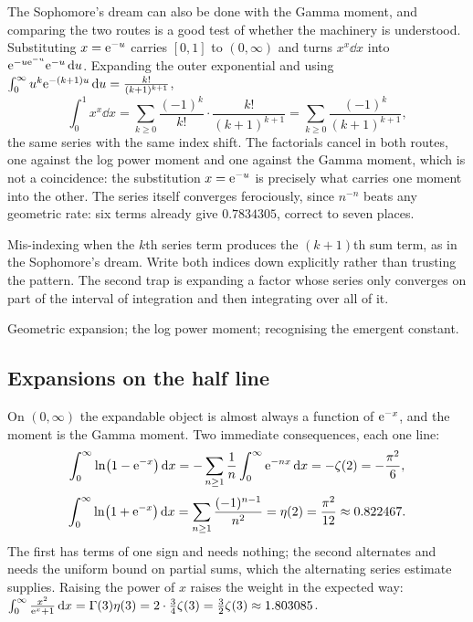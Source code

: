 \begin{keynote}
The Sophomore's dream can also be done with the Gamma moment, and comparing the two routes is a good test of whether the machinery is understood. Substituting $x=\mathrm{e}^{-u}$ carries $[0,1]$ to $(0,\infty)$ and turns $x^{x}\dd x$ into $\mathrm{e}^{-u\mathrm{e}^{-u}}\mathrm{e}^{-u}\,\mathrm{d} u$. Expanding the outer exponential and using $\int_0^\infty u^{k}\mathrm{e}^{-(k+1)u}\,\mathrm{d} u=\frac{k!}{(k+1)^{k+1}}$,
\[\int_0^1x^{x}\dd x=\sum_{k\geq0}\frac{(-1)^{k}}{k!}\cdot\frac{k!}{(k+1)^{k+1}}=\sum_{k\geq0}\frac{(-1)^{k}}{(k+1)^{k+1}},\]
the same series with the same index shift. The factorials cancel in both routes, one against the log power moment and one against the Gamma moment, which is not a coincidence: the substitution $x=\mathrm{e}^{-u}$ is precisely what carries one moment into the other. The series itself converges ferociously, since $n^{-n}$ beats any geometric rate: six terms already give $0.7834305$, correct to seven places.
\end{keynote}

\begin{trap}
Mis-indexing when the $k$th series term produces the $(k+1)$th sum term, as in the Sophomore's dream. Write both indices down explicitly rather than trusting the pattern. The second trap is expanding a factor whose series only converges on part of the interval of integration and then integrating over all of it.
\end{trap}

\begin{seealsob}Geometric expansion; the log power moment; recognising the emergent constant.\end{seealsob}

\subsection{Expansions on the half line}

On $(0,\infty)$ the expandable object is almost always a function of $\mathrm{e}^{-x}$, and the moment is the Gamma moment. Two immediate consequences, each one line:
\[\int_0^{\infty}\ln\bigl(1-\mathrm{e}^{-x}\bigr)\,\mathrm{d} x=-\sum_{n\geq1}\frac1n\int_0^\infty \mathrm{e}^{-nx}\,\mathrm{d} x=-\zeta(2)=-\frac{\pi^{2}}{6},\]
\[\int_0^{\infty}\ln\bigl(1+\mathrm{e}^{-x}\bigr)\,\mathrm{d} x=\sum_{n\geq1}\frac{(-1)^{n-1}}{n^{2}}=\eta(2)=\frac{\pi^{2}}{12}\approx0.822467.\]
The first has terms of one sign and needs nothing; the second alternates and needs the uniform bound on partial sums, which the alternating series estimate supplies. Raising the power of $x$ raises the weight in the expected way: $\int_0^\infty\frac{x^{2}}{\mathrm{e}^{x}+1}\,\mathrm{d} x=\Gamma(3)\eta(3)=2\cdot\tfrac34\zeta(3)=\tfrac32\zeta(3)\approx1.803085$.

